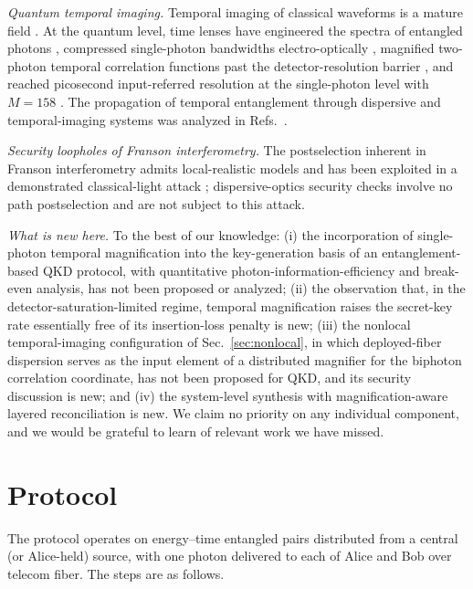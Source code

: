 \documentclass[11pt]{article}
\begin{document}
\emph{Quantum temporal imaging.} Temporal imaging of classical waveforms is a mature field \cite{KolnerNazarathy1989,Kolner1994,Salem2013}. At the quantum level, time lenses have engineered the spectra of entangled photons \cite{Donohue2016}, compressed single-photon bandwidths electro-optically \cite{Karpinski2017}, magnified two-photon temporal correlation functions past the detector-resolution barrier \cite{Mittal2017}, and reached picosecond input-referred resolution at the single-photon level with $M=158$ \cite{Joshi2022}. The propagation of temporal entanglement through dispersive and temporal-imaging systems was analyzed in Refs.~\cite{TsangPsaltis2006,Patera2017}.

\emph{Security loopholes of Franson interferometry.} The postselection inherent in Franson interferometry admits local-realistic models \cite{Aerts1999} and has been exploited in a demonstrated classical-light attack \cite{Jogenfors2015}; dispersive-optics security checks involve no path postselection and are not subject to this attack.

\emph{What is new here.} To the best of our knowledge: (i) the incorporation of single-photon temporal magnification into the key-generation basis of an entanglement-based QKD protocol, with quantitative photon-information-efficiency and break-even analysis, has not been proposed or analyzed; (ii) the observation that, in the detector-saturation-limited regime, temporal magnification raises the secret-key rate essentially free of its insertion-loss penalty is new; (iii) the nonlocal temporal-imaging configuration of Sec.~\ref{sec:nonlocal}, in which deployed-fiber dispersion serves as the input element of a distributed magnifier for the biphoton correlation coordinate, has not been proposed for QKD, and its security discussion is new; and (iv) the system-level synthesis with magnification-aware layered reconciliation is new. We claim no priority on any individual component, and we would be grateful to learn of relevant work we have missed.

\section{Protocol}
\label{sec:protocol}

The protocol operates on energy--time entangled pairs distributed from a central (or Alice-held) source, with one photon delivered to each of Alice and Bob over telecom fiber. The steps are as follows.
\end{document}
